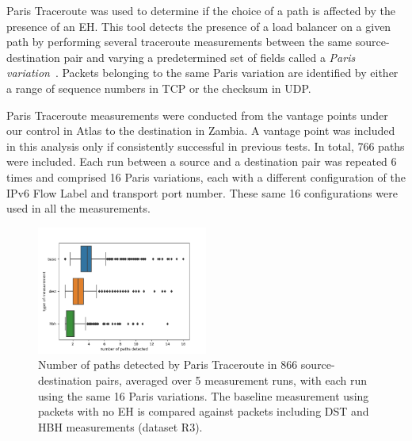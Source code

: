 \documentclass[conference]{IEEEtran}
\begin{document}
Paris Traceroute was used to determine if the choice of a path is affected by
the presence of an EH.  This tool detects the presence of a load balancer on a
given path by performing several traceroute measurements between the same
source-destination pair and varying a predetermined set of fields called a
\textit{Paris variation}~\cite{augustin2006avoiding}.  Packets belonging to the
same Paris variation are identified by either a range of sequence numbers in
TCP or the checksum in UDP.


Paris Traceroute measurements were conducted from the vantage points under our
control in Atlas to the destination in Zambia.  A vantage point was included in
this analysis only if consistently successful in previous tests.  In total, 766
paths were included.  Each run between a source and a destination pair was repeated 6
times and comprised 16 Paris variations, each with a different configuration of
the IPv6 Flow Label and transport port number.  These same 16 configurations
were used in all the measurements. 



\begin{figure}[t]
\centering
  \includegraphics[width=0.5\textwidth]{boxplot-paths-detected.png}
  \caption{Number of paths detected by Paris Traceroute in 866
source-destination pairs, averaged over 5 measurement runs, with each run using
the same 16 Paris variations. The baseline measurement using packets with no EH
is compared against packets including DST and HBH measurements (dataset R3).}
  \label{fig:paths-detected}
\end{figure}
\end{document}
